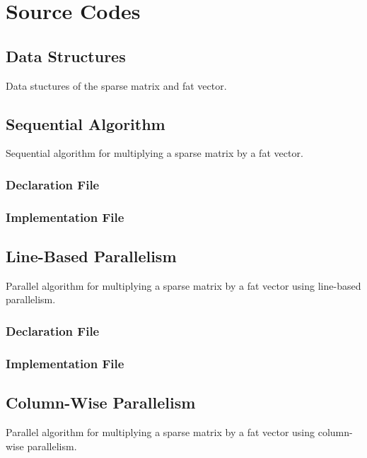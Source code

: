 \documentclass[12pt,oneside]{book} %
\begin{document}
\chapter{Source Codes}
\begin{subappendices}
    \section{Data Structures}\label{appendix:data-structures}
    Data stuctures of the sparse matrix and fat vector.
    

    \newpage

    \section{Sequential Algorithm}\label{appendix:sequential}
    Sequential algorithm for multiplying a sparse matrix by a fat vector.
    \subsection{Declaration File}
    
    \subsection{Implementation File}
    

    \section{Line-Based Parallelism}\label{appendix:line-based}
    Parallel algorithm for multiplying a sparse matrix by a fat vector using
    line-based parallelism.
    \subsection{Declaration File}
    
    \subsection{Implementation File}
    

    \section{Column-Wise Parallelism}\label{appendix:column-based}
    Parallel algorithm for multiplying a sparse matrix by a fat vector using
    column-wise parallelism.

\end{subappendices}
\end{document}
